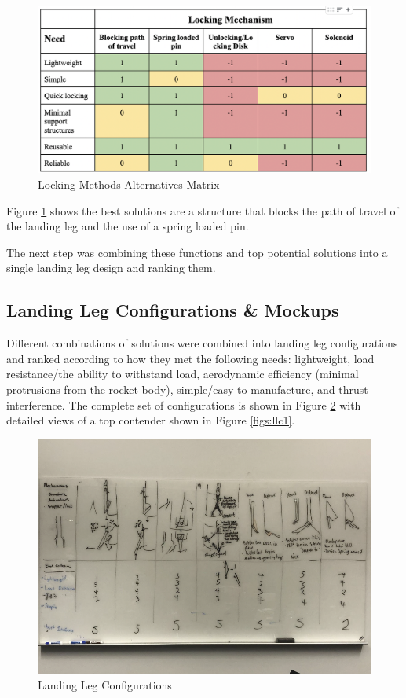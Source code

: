\begin{figure}[H]
\centering
\includegraphics[scale=0.8]{src/figs/lockingmechanismalternativesmatrix.png}
\caption{Locking Methods Alternatives Matrix}
\label{figs:lmam}
\end{figure}

Figure \ref{figs:lmam} shows the best solutions are a structure that blocks the path of travel of the landing leg and the use of a spring loaded pin. 

The next step was combining these functions and top potential solutions into a single landing leg design and ranking them. 

\subsection{Landing Leg Configurations \& Mockups}

Different combinations of solutions were combined into landing leg configurations and ranked according to how they met the following needs: lightweight, load resistance/the ability to withstand load, aerodynamic efficiency (minimal protrusions from the rocket body), simple/easy to manufacture, and thrust interference. The complete set of configurations is shown in Figure \ref{figs:llc} with detailed views of a top contender shown in Figure \ref{figs:llc1}.

\begin{figure}[H]
\centering
\includegraphics[scale=0.8]{src/figs/configs.png}
\caption{Landing Leg Configurations}
\label{figs:llc}
\end{figure}

